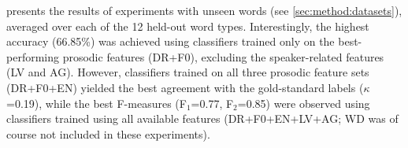 \documentclass[a4paper]{article}
\begin{document}
		 presents the results of experiments with unseen words (see \cref{sec:method:datasets}), averaged over each of the 12 held-out word types.
		Interestingly, the highest accuracy (66.85\%) was achieved using classifiers trained only on the best-performing prosodic features (DR+F0), excluding the speaker-related features (LV and AG). However, classifiers trained on all three prosodic feature sets (DR+F0+EN) yielded the best agreement with the gold-standard labels ($\kappa$=0.19), while the best F-measures (F$_1$=0.77, F$_2$=0.85) were observed using classifiers trained using all available features (DR+F0+EN+LV+AG; WD was of course not included in these experiments).
		
	


		
\end{document}
